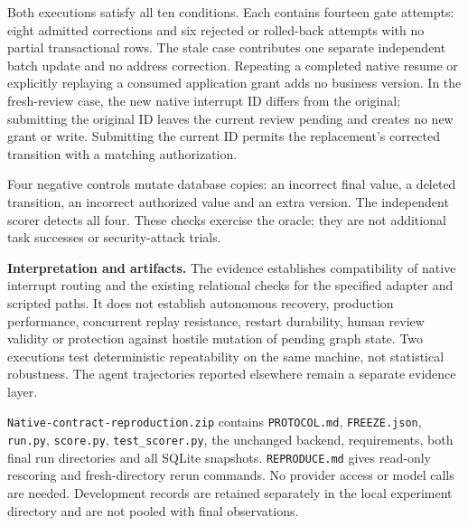 Both executions satisfy all ten conditions. Each contains fourteen gate
attempts: eight admitted corrections and six rejected or rolled-back attempts
with no partial transactional rows. The stale case contributes one separate
independent batch update and no address correction. Repeating a completed
native resume or explicitly replaying a consumed application grant adds no
business version. In the fresh-review case, the new native interrupt ID
differs from the original; submitting the original ID leaves the current
review pending and creates no new grant or write. Submitting the current ID
permits the replacement's corrected transition with a matching authorization.

Four negative controls mutate database copies: an incorrect final value,
a deleted transition, an incorrect authorized value and an extra version.
The independent scorer detects all four. These checks exercise the oracle;
they are not additional task successes or security-attack trials.

\textbf{Interpretation and artifacts.}
The evidence establishes compatibility of native interrupt routing and the
existing relational checks for the specified adapter and scripted paths.
It does not establish autonomous recovery, production performance, concurrent
replay resistance, restart durability, human review validity or protection
against hostile mutation of pending graph state. Two executions test
deterministic repeatability on the same machine, not statistical robustness.
The agent trajectories reported elsewhere remain a separate evidence layer.

\texttt{Native-contract-reproduction.zip} contains \texttt{PROTOCOL.md},
\texttt{FREEZE.json}, \texttt{run.py}, \texttt{score.py},
\texttt{test\_scorer.py}, the unchanged backend, requirements, both final
run directories and all SQLite snapshots. \texttt{REPRODUCE.md} gives
read-only rescoring and fresh-directory rerun commands. No provider access
or model calls are needed. Development records are retained separately in
the local experiment directory and are not pooled with final observations.
